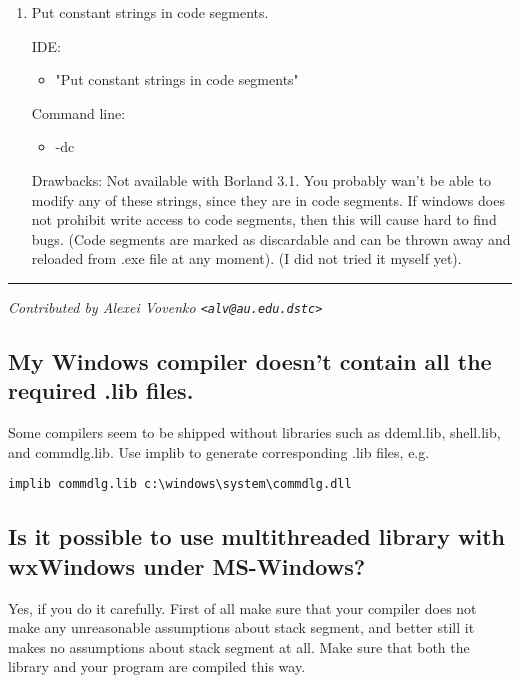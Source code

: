 \begin{enumerate}
Command line:
\begin{itemize}
\item -Ff=4
\end{itemize}

Drawbacks: you can't run more than one instance of your program
anymore. This is architectural flaw in MS-Windows. If you need to,
make several copies of your .exe under different names and run 
one copy of each.
\item Put constant strings in code segments.

IDE:
\begin{itemize}
\item "Put constant strings in code segments"
\end{itemize}

Command line:
\begin{itemize}
\item -dc
\end{itemize}

Drawbacks: Not available with Borland 3.1. 
You probably wan't be able to modify any of these strings, since
they are in code segments. If windows does not prohibit write
access to code segments, then this will cause hard to find bugs.
(Code segments are marked as discardable and can be thrown away and
reloaded from .exe file at any moment).
(I did not tried it myself yet).
\end{enumerate}

\hrule
{\it Contributed by Alexei Vovenko \verb$<alv@au.edu.dstc>$}

\subsection{My Windows compiler doesn't contain all the required .lib files.}

Some compilers seem to be shipped without libraries such as ddeml.lib, shell.lib,
and commdlg.lib. Use implib to generate corresponding .lib files, e.g.

\begin{verbatim}
implib commdlg.lib c:\windows\system\commdlg.dll
\end{verbatim}

\subsection{Is it possible to use multithreaded library with wxWindows under MS-Windows?}

Yes, if you do it carefully. First of all make sure that your
compiler does not make any unreasonable assumptions about stack
segment, and better still it makes no assumptions about stack segment
at all. Make sure that both the library and your program are compiled 
this way. 

